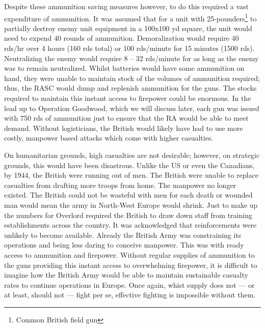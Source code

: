 \documentclass[noraggedright]{turabian-researchpaper}
\begin{document}
Despite these ammunition saving measures however, to do this required a vast 
expenditure of ammunition.  It was assumed that for a unit with
25-pounders\footnote{Common British field gun} to partially destroy enemy unit
equipment in a 100x100 yd square, the unit would need to expend 40 rounds of
ammunition.  Demoralization would require 40 rds/hr over 4 hours (160 rds 
total) or 100 rds/minute for 15 minutes (1500 rds).  Neutralizing the enemy 
would require 8 -- 32 rds/minute for as long as the enemy was to remain 
neutralized.\autocite[133]{gunfire}  Whilst batteries would have some
ammunition on hand, %
they were unable to maintain stock of the volumes of ammunition required; thus,
the RASC would dump and replenish ammunition for the guns.  
The stocks required to maintain this instant access to firepower could be 
enormous.  In the lead up to Operation Goodwood, which we will discuss later,
each gun was issued with 750 rds of ammunition just to ensure that the RA would
be able to meet demand.  Without logisticians, the British would likely have 
had to use more costly, manpower based attacks which come with higher 
casualties.  

On humanitarian grounds, high casualties are not desirable; however, on 
strategic grounds, this would have been disastrous.  Unlike the US or
even the Canadians, by 1944, the British were running out of men.  The 
British were unable to replace casualties from drafting more troops from 
home.  The manpower no longer existed.  The British could not be wasteful 
with men for each death or wounded man would mean the army in North-West 
Europe would shrink.  %
Just to make up the numbers for Overlord required the British to draw down
staff from training establishments across the country.  It was acknowledged
that reinforcements were unlikely to become available. %
Already the British Army was constraining its operations and being less 
daring to conceive manpower.  This was with ready access to ammunition and
firepower.  Without regular supplies of ammunition to the guns providing this
instant access to overwhelming firepower, it is difficult to imagine how the 
British Army would be able to maintain sustainable casualty rates to continue
operations in Europe.  Once again, whist supply does not --- or at least,
should not --- fight per se, effective fighting is impossible without them.
\end{document}
